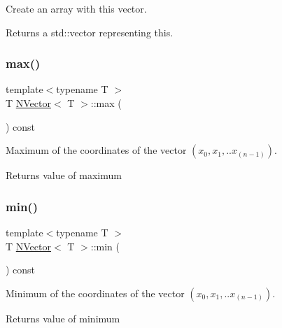 Create an array with {\ttfamily this} vector. 

\begin{DoxyReturn}{Returns}
a {\ttfamily std\+::vector} representing {\ttfamily this}. 
\end{DoxyReturn}
\mbox{\label{class_n_vector_afc7553743872ccb71e902a154eb60dc2}} 
\subsubsection{\texorpdfstring{max()}{max()}}
{\footnotesize\ttfamily template$<$typename T $>$ \\
T \mbox{\hyperlink{class_n_vector}{N\+Vector}}$<$ T $>$\+::max (\begin{DoxyParamCaption}{ }\end{DoxyParamCaption}) const}



Maximum of the coordinates of the vector $ (x_0, x_1, .. x_{(n-1)}) $. 

\begin{DoxyReturn}{Returns}
value of maximum 
\end{DoxyReturn}
\mbox{\label{class_n_vector_ab81d84a1fce6b8647e5fd4e34ec90db7}} 
\subsubsection{\texorpdfstring{min()}{min()}}
{\footnotesize\ttfamily template$<$typename T $>$ \\
T \mbox{\hyperlink{class_n_vector}{N\+Vector}}$<$ T $>$\+::min (\begin{DoxyParamCaption}{ }\end{DoxyParamCaption}) const}



Minimum of the coordinates of the vector $ (x_0, x_1, .. x_{(n-1)}) $. 

\begin{DoxyReturn}{Returns}
value of minimum 
\end{DoxyReturn}
\mbox{\label{class_n_vector_ab0521dd8dc4af0e9167770f85084d2d6}} 
